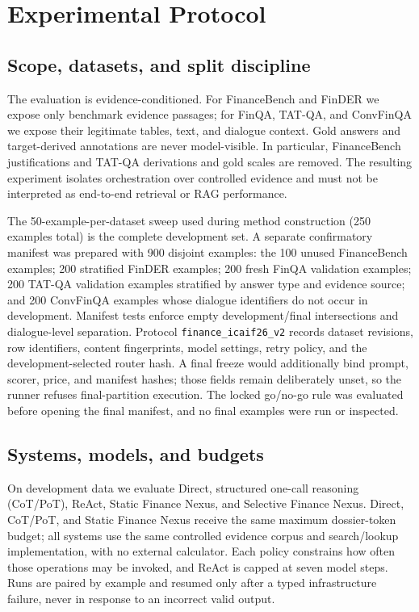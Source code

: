 \section{Experimental Protocol}
\label{sec:protocol}

\subsection{Scope, datasets, and split discipline}

The evaluation is evidence-conditioned. For FinanceBench and FinDER we expose only benchmark evidence passages; for FinQA, TAT-QA, and ConvFinQA we expose their legitimate tables, text, and dialogue context. Gold answers and target-derived annotations are never model-visible. In particular, FinanceBench justifications and TAT-QA derivations and gold scales are removed. The resulting experiment isolates orchestration over controlled evidence and must not be interpreted as end-to-end retrieval or RAG performance.

The 50-example-per-dataset sweep used during method construction (250 examples total) is the complete development set. A separate confirmatory manifest was prepared with 900 disjoint examples: the 100 unused FinanceBench examples; 200 stratified FinDER examples; 200 fresh FinQA validation examples; 200 TAT-QA validation examples stratified by answer type and evidence source; and 200 ConvFinQA examples whose dialogue identifiers do not occur in development. Manifest tests enforce empty development/final intersections and dialogue-level separation. Protocol \texttt{finance\_icaif26\_v2} records dataset revisions, row identifiers, content fingerprints, model settings, retry policy, and the development-selected router hash. A final freeze would additionally bind prompt, scorer, price, and manifest hashes; those fields remain deliberately unset, so the runner refuses final-partition execution. The locked go/no-go rule was evaluated before opening the final manifest, and no final examples were run or inspected.

\subsection{Systems, models, and budgets}

On development data we evaluate Direct, structured one-call reasoning (CoT/PoT), ReAct, Static Finance Nexus, and Selective Finance Nexus. Direct, CoT/PoT, and Static Finance Nexus receive the same maximum dossier-token budget; all systems use the same controlled evidence corpus and search/lookup implementation, with no external calculator. Each policy constrains how often those operations may be invoked, and ReAct is capped at seven model steps. Runs are paired by example and resumed only after a typed infrastructure failure, never in response to an incorrect valid output.


